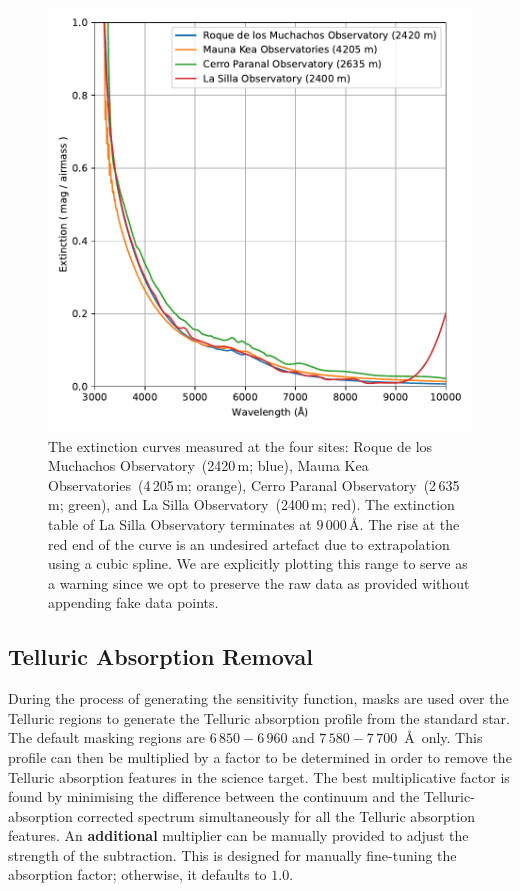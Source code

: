 \documentclass[twocolumn, linenumbers]{aastex631}
\begin{document}
\begin{figure}
    \centering
    \includegraphics[width=\columnwidth]{fig_07_extinction_curves.pdf}
    \caption{The extinction curves measured at the four sites: Roque de los
    Muchachos Observatory~(2420\,m; blue), Mauna Kea Observatories~(4\,205\,m;
    orange), Cerro Paranal Observatory~(2\,635\,m; green), and La Silla
    Observatory~(2400\,m; red). The extinction table of La Silla Observatory
    terminates at $9\,000$\,\AA. The rise at the red end of the curve is an
    undesired artefact due to extrapolation using a cubic spline. We are
    explicitly plotting this range to serve as a warning since we opt to
    preserve the raw data as provided without appending fake data points.}
    \label{fig:extinction}
\end{figure}

\subsection{Telluric Absorption Removal}
During the process of generating the sensitivity function, masks are used
over the Telluric regions to generate the Telluric absorption
profile from the standard star. The default masking regions are $6\,850-6\,960$
and $7\,580-7\,700$\ \AA\ only. This profile can then be multiplied
by a factor to be determined in order to remove the Telluric absorption
features in the science target. The best multiplicative factor is found
by minimising the difference between the continuum and the Telluric-absorption
corrected spectrum simultaneously for all the Telluric absorption features.
An \textbf{additional} multiplier can be manually provided to adjust the
strength of the subtraction. This is designed for manually fine-tuning the
absorption factor; otherwise, it defaults to $1.0$.
\end{document}
